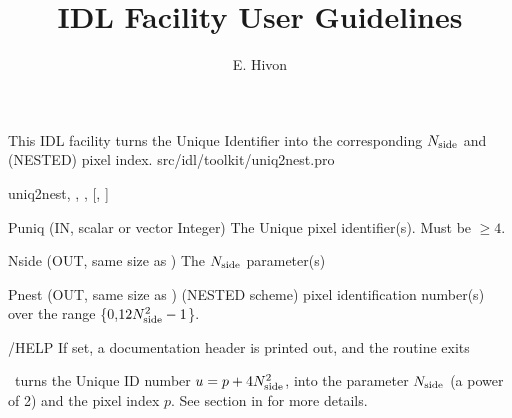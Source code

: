 
\sloppy


\title{\healpix IDL Facility User Guidelines}
 \section[uniq2nest]{ }
\label{idl:uniq2nest}
\author{E. Hivon}

\begin{facility}
{This IDL facility turns the Unique Identifier into the corresponding $N_{\rm side}$ and (NESTED) pixel index. 
}
{src/idl/toolkit/uniq2nest.pro}
\end{facility}

\begin{IDLformat}
{uniq2nest, 
, 
, 
 [,%
]}
\end{IDLformat}


\begin{qualifiers}
  \begin{qulist}{} %

\item[{Puniq}]  (IN, scalar or vector Integer) The \healpix Unique pixel identifier(s). Must be $\ge 4$.
\item[{Nside}]  (OUT, same size as ) The \healpix $N_{\rm side}$ parameter(s)
\item[{Pnest}]  (OUT, same size as ) (NESTED scheme) pixel identification number(s) over the range \{0,$12N_{\rm side}^2-1$\}.
  \end{qulist}
\end{qualifiers}

\begin{keywords}
  \begin{kwlist}{} %

\item[{/HELP}]  If set, a documentation header is printed out, and the routine exits
  \end{kwlist}
\end{keywords}


\begin{codedescription}
{\thedocid\ turns the Unique ID number $u = p + 4 N_{\rm side}^2$, into the parameter $N_{\rm side}$ (a power of 2) and the pixel index $p$. See  section in 
 for more details.
}
\end{codedescription}


